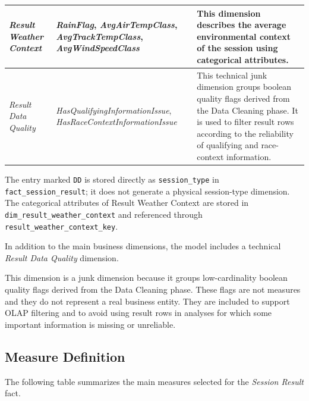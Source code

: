 \documentclass[a4paper,11pt]{article}
\begin{document}
\begin{longtable}{|p{3cm}|p{5.3cm}|p{6.5cm}|}
		\textit{Result Weather Context}
		& \textit{RainFlag}, \textit{AvgAirTempClass}, \textit{AvgTrackTempClass},
		\textit{AvgWindSpeedClass}
		& This dimension describes the average environmental context of the session using
		categorical attributes. \\
		\hline
		
		\textit{Result Data Quality}
		& \textit{HasQualifyingInformationIssue},
		\textit{HasRaceContextInformationIssue}
		& This technical junk dimension groups boolean quality flags derived from the
		Data Cleaning phase. It is used to filter result rows according to the
		reliability of qualifying and race-context information. \\
		\hline
		
	\end{longtable}

	The entry marked \texttt{DD} is stored directly as \texttt{session\_type} in
	\texttt{fact\_session\_result}; it does not generate a physical session-type dimension.
	The categorical attributes of Result Weather Context are stored in
	\texttt{dim\_result\_weather\_context} and referenced through
	\texttt{result\_weather\_context\_key}.
	
	
	In addition to the main business dimensions, the model includes a technical
	\textit{Result Data Quality} dimension.
	
	This dimension is a junk dimension because it groups low-cardinality boolean
	quality flags derived from the Data Cleaning phase. These flags are not measures
	and they do not represent a real business entity. They are included to support
	OLAP filtering and to avoid using result rows in analyses for which some
	important information is missing or unreliable.
	
	\subsection{Measure Definition}
	

	The following table summarizes the main measures selected for the
	\textit{Session Result} fact.
	
\end{document}
